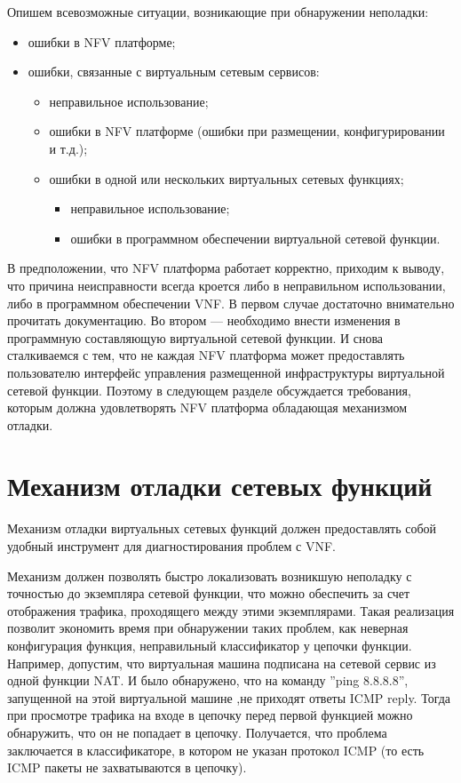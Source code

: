 \documentclass[oneside,final,14pt,a4paper]{extreport}
\begin{document}
Опишем всевозможные ситуации, возникающие при обнаружении неполадки:
\begin{itemize}
    \item ошибки в NFV платформе;
    \item ошибки, связанные с виртуальным сетевым сервисов:
    \begin{itemize}
        \item неправильное использование;
        \item ошибки в NFV платформе (ошибки при размещении, конфигурировании и т.д.);
        \item ошибки в одной или нескольких виртуальных сетевых функциях;
        \begin{itemize}
            \item неправильное использование;
            \item ошибки в программном обеспечении виртуальной сетевой функции.
        \end{itemize}
    \end{itemize}
\end{itemize}

В предположении, что NFV платформа работает корректно, приходим к выводу, что причина неисправности всегда кроется либо в неправильном использовании, либо в программном обеспечении VNF. В первом случае достаточно внимательно прочитать документацию. Во втором --- необходимо внести изменения в программную составляющую виртуальной сетевой функции. И снова сталкиваемся с тем, что не каждая NFV платформа может предоставлять пользователю интерфейс управления размещенной инфраструктуры виртуальной сетевой функции. Поэтому в следующем разделе обсуждается требования, которым должна удовлетворять NFV платформа обладающая механизмом отладки.

\section{Механизм отладки сетевых функций}
\label{sec:debug_mechanism}

Механизм отладки виртуальных сетевых функций должен предоставлять собой удобный инструмент для диагностирования проблем с VNF. 

Механизм должен позволять быстро локализовать возникшую неполадку с точностью до экземпляра сетевой функции, что можно обеспечить за счет отображения трафика, проходящего между этими экземплярами. Такая реализация позволит экономить время при обнаружении таких проблем, как неверная конфигурация функция, неправильный классификатор у цепочки функции. Например, допустим, что виртуальная машина подписана на сетевой сервис из одной функции NAT. И было обнаружено, что на команду ''ping 8.8.8.8'', запущенной на этой виртуальной машине ,не приходят ответы ICMP reply. Тогда при просмотре трафика на входе в цепочку перед первой функцией можно обнаружить, что он не попадает в цепочку. Получается, что проблема заключается в классификаторе, в котором не указан протокол ICMP (то есть ICMP пакеты не захватываются в цепочку). 
\end{document}
